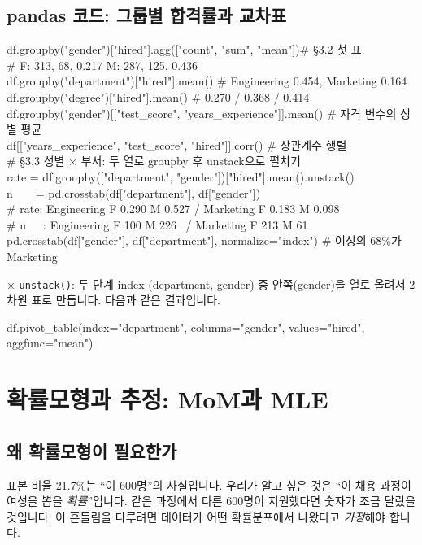 \documentclass[11pt,a4paper]{article}
\newcommand{\code}[1]{\texttt{#1}}
\newcommand{\aside}[1]{{\footnotesize\color{black!65}#1}}
\begin{document}
\subsection*{pandas 코드: 그룹별 합격률과 교차표}
\begin{codebox}
df.groupby("gender")["hired"].agg(["count", "sum", "mean"])\hfill \# \S3.2 첫 표\\
\# F: 313, 68, 0.217 \quad M: 287, 125, 0.436\\[3pt]
df.groupby("department")["hired"].mean() \hfill \# Engineering 0.454, Marketing 0.164\\
df.groupby("degree")["hired"].mean() \hfill \# 0.270 / 0.368 / 0.414\\[3pt]
df.groupby("gender")[["test\_score", "years\_experience"]].mean() \hfill \# 자격 변수의 성별 평균\\
df[["years\_experience", "test\_score", "hired"]].corr() \hfill \# 상관계수 행렬\\[3pt]
\# \S3.3 성별 $\times$ 부서: 두 열로 groupby 후 unstack으로 펼치기\\
rate = df.groupby(["department", "gender"])["hired"].mean().unstack()\\
n\ \ \ \ = pd.crosstab(df["department"], df["gender"])\\
\# rate: Engineering F 0.290 M 0.527 / Marketing F 0.183 M 0.098\\
\# n\ \ \ : Engineering F 100 M 226 \ / Marketing F 213 M 61\\[3pt]
pd.crosstab(df["gender"], df["department"], normalize="index") \hfill \# 여성의 68\%가 Marketing
\end{codebox}
\aside{※ \code{unstack()}: 두 단계 index (department, gender) 중 안쪽(gender)을 열로 올려서 2차원 표로 만듭니다. 다음과 같은 결과입니다.}
\begin{codebox}
df.pivot\_table(index="department", columns="gender", values="hired", aggfunc="mean")
\end{codebox}

\section{확률모형과 추정: MoM과 MLE}

\subsection{왜 확률모형이 필요한가}
표본 비율 21.7\%는 ``이 600명''의 사실입니다. 우리가 알고 싶은 것은 ``이 채용 과정이 여성을 뽑을 \emph{확률}''입니다. 같은 과정에서 다른 600명이 지원했다면 숫자가 조금 달랐을 것입니다. 이 흔들림을 다루려면 데이터가 어떤 확률분포에서 나왔다고 \emph{가정}해야 합니다.
\end{document}
